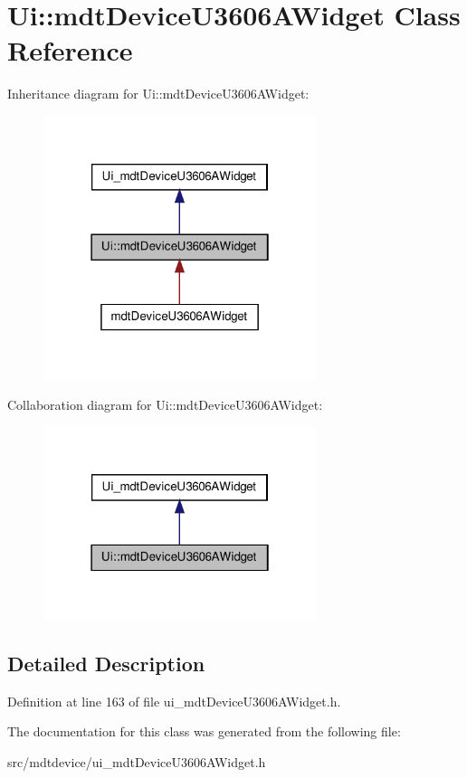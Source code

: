 \hypertarget{class_ui_1_1mdt_device_u3606_a_widget}{
\section{Ui::mdtDeviceU3606AWidget Class Reference}
\label{class_ui_1_1mdt_device_u3606_a_widget}
}


Inheritance diagram for Ui::mdtDeviceU3606AWidget:\nopagebreak
\begin{figure}[H]
\begin{center}
\leavevmode
\includegraphics[width=226pt]{class_ui_1_1mdt_device_u3606_a_widget__inherit__graph}
\end{center}
\end{figure}


Collaboration diagram for Ui::mdtDeviceU3606AWidget:\nopagebreak
\begin{figure}[H]
\begin{center}
\leavevmode
\includegraphics[width=226pt]{class_ui_1_1mdt_device_u3606_a_widget__coll__graph}
\end{center}
\end{figure}


\subsection{Detailed Description}


Definition at line 163 of file ui\_\-mdtDeviceU3606AWidget.h.



The documentation for this class was generated from the following file:\begin{DoxyCompactItemize}
\item 
src/mdtdevice/ui\_\-mdtDeviceU3606AWidget.h\end{DoxyCompactItemize}
